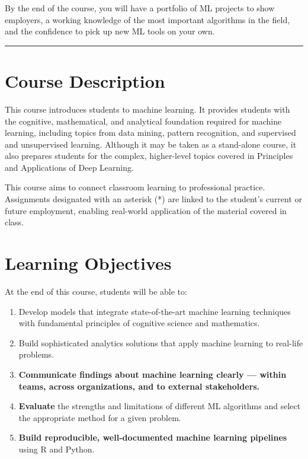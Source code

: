 \documentclass[
  10pt,
]{article}
\begin{document}
By the end of the course, you will have a portfolio of ML projects to
show employers, a working knowledge of the most important algorithms in
the field, and the confidence to pick up new ML tools on your own.

\begin{center}\rule{0.5\linewidth}{0.5pt}\end{center}

\section*{Course Description}\label{course-description}

This course introduces students to machine learning. It provides
students with the cognitive, mathematical, and analytical foundation
required for machine learning, including topics from data mining,
pattern recognition, and supervised and unsupervised learning. Although
it may be taken as a stand-alone course, it also prepares students for
the complex, higher-level topics covered in Principles and Applications
of Deep Learning.

This course aims to connect classroom learning to professional practice.
Assignments designated with an asterisk (*) are linked to the student's
current or future employment, enabling real-world application of the
material covered in class.

\section*{Learning Objectives}\label{learning-objectives}

At the end of this course, students will be able to:

\begin{enumerate}
\def\labelenumi{\arabic{enumi}.}
\item
  Develop models that integrate state-of-the-art machine learning
  techniques with fundamental principles of cognitive science and
  mathematics.
\item
  Build sophisticated analytics solutions that apply machine learning to
  real-life problems.
\item
  \textbf{Communicate findings about machine learning clearly --- within
  teams, across organizations, and to external stakeholders.}
\item
  \textbf{Evaluate} the strengths and limitations of different ML
  algorithms and select the appropriate method for a given problem.
\item
  \textbf{Build reproducible, well-documented machine learning
  pipelines} using R and Python.
\end{enumerate}
\end{document}
